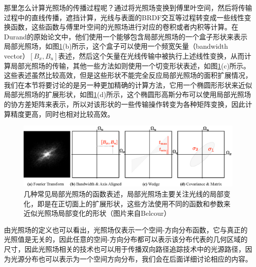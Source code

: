那里怎么计算光照场的传播过程呢？\cite{a:AFrequencyAnalysisofLightTransport}通过将光照场变换到傅里叶空间，然后将传输过程中的直线传播，遮挡计算，光线与表面的BRDF交互等过程转变成一些线性变换函数，这些函数与傅里叶空间的光照场进行对应的卷积或者内积等计算。在Durand的原始论文中，他们使用一个能够包含局部光照场的一个盒子形状来表示局部光照场，如图\ref{f:pt-local-light-field-representation}(b)所示，这个盒子可以使用一个频宽矢量（bandwidth vector）$[B_x,B_u]$表述，然后这个矢量在光线传输中被执行上述线性变换，从而计算局部光照场的传输，其他一些方法如\cite{a:FrequencyAnalysisandShearedReconstructionforRenderingMotionBlur}则使用一个切变形状表述，如图\ref{f:pt-local-light-field-representation}(c)所示。这些表述虽然比较高效，但是这些形状不能完全反应局部光照场的面积扩展情况，我们在本节将要讨论的是另一种更加精确的计算方法，它用一个椭圆形形状来近似局部光照场的扩展形状，如图\ref{f:pt-local-light-field-representation}(d)所示，这个椭圆形高斯分布可以使用局部光照场的协方差矩阵来表示，所以对该形状的一些传输操作转变为各种矩阵变换，因此计算精度更高，同时也相对比较高效。

\begin{figure}
\begin{fullwidth}
	\includegraphics[width=\thewidth]{figures/pt/local-light-representation}
	\caption{几种常见局部光照场的函数表述，局部光照场主要关注光线的局部变化，即是在正切面上的扩展形状，这些方法使用不同的函数和参数来近似光照场局部变化的形状（图片来自Belcour）}
	\label{f:pt-local-light-field-representation}
\end{fullwidth}
\end{figure}

由光照场的定义也可以看出，光照场仅表示一个空间-方向分布函数，它与真正的光照值是无关的，因此任意的空间-方向分布都可以表示该分布代表的几何区域的尺寸，因此光照场相关的技术也可以用于传播双向路径追踪技术中的光源路径，因为光源分布也可以表示为一个空间方向分布，我们会在后面详细讨论相应的内容。





